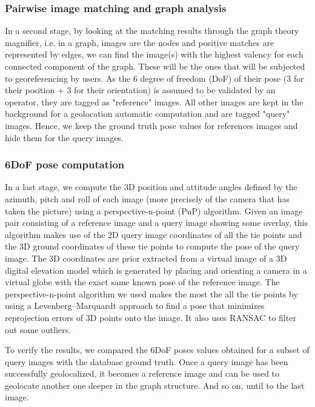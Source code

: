 \documentclass[fleqn,10pt]{wlpeerj} %
\begin{document}
\subsubsection*{Pairwise image matching and graph analysis}
In a second stage,
by looking at the matching results through the graph theory magnifier, i.e. 
in a graph, images are the nodes and positive matches are represented by edges, 
we can find the image(s) with the highest valency for each connected component 
of the graph.
These will be the ones that will be subjected to georeferencing by users. 
As the 6 degree of freedom (DoF) of their pose (3 for their position + 3 for 
their orientation) is assumed to be validated by an operator, they are tagged as 
"reference" images. 
All other images are kept in the background for a geolocation automatic computation
and are tagged "query" images.
Hence, we keep the ground truth pose values for references images and hide them 
for the query images.

\subsubsection*{6DoF pose computation}
In a last stage, 
we compute the 3D position and attitude angles defined by the azimuth, pitch
and roll of each image (more precisely of the camera that has taken the 
picture) using a perspective-n-point (PnP) algorithm. Given an image pair consisting
of a reference image and a query image showing some overlay, this algorithm makes 
use of the 2D query image coordinates of all the tie points and the 3D ground 
coordinates of these tie points to compute the pose of the query image. 
The 3D coordinates are prior extracted from a virtual image of a 3D digital 
elevation model which is generated by placing and orienting a camera in
a virtual globe with the exact same known pose of the reference image.
The perspective-n-point algorithm we used makes the most the all the tie points
by using a Levenberg–Marquardt approach to find a pose that minimizes reprojection 
errors of 3D points onto the image. It also uses RANSAC to filter out some outliers.

To verify the results, we compared the 6DoF poses values obtained for a subset 
of query images with the database ground truth. Once a query image has been
successfully geolocalized, it becomes a reference image and can be used to geolocate
another one deeper in the graph structure. And so on, until to the last image.
\end{document}

